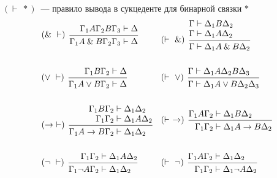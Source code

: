 \documentclass[main]{subfiles}
\begin{document}
$(\vdash \ *)$~--- правило вывода в сукцеденте для бинарной связки $*$
\begin{align*}
     & \begin{prooftree}
           \hypo{\Gamma_1 A\Gamma_2 B\Gamma_3 &\vdash \Delta}
           \infer[left label=$(\and \ \vdash)$]1{\Gamma_1 A \and B \Gamma_2 \Gamma_3 &\vdash \Delta}
       \end{prooftree} &
     & \begin{prooftree}
           \hypo{ \Gamma &\vdash \Delta_1 B\Delta_2}
           \infer[no rule]1{ \Gamma &\vdash \Delta_1A\Delta_2 }
           \infer[left label=$(\vdash \ \and)$]1{ \Gamma &\vdash \Delta_1 A \and B \Delta_2}
       \end{prooftree}
    \\
    \\
     & \begin{prooftree}
           \hypo{\Gamma_1 B\Gamma_2 &\vdash \Delta}
           \infer[left label=$(\lor \ \vdash)$]1{\Gamma_1 A\lor B\Gamma_2 &\vdash \Delta}
       \end{prooftree}            &
     & \begin{prooftree}
           \hypo{\Gamma &\vdash \Delta_1A\Delta_2B\Delta_3}
           \infer[left label=$(\vdash \ \lor)$]1{\Gamma &\vdash \Delta_1 A\lor B\Delta_2\Delta_3}
       \end{prooftree}
    \\
    \\
     & \begin{prooftree}
           \hypo{\Gamma_1B\Gamma_2 &\vdash\Delta_1\Delta_2}
           \infer[no rule]1{\Gamma_1\Gamma_2 &\vdash \Delta_1 A \Delta_2}
           \infer[left label=$(\to \ \vdash)$]1{\Gamma_1 A\to B\Gamma_2 &\vdash \Delta_1 \Delta_2}
       \end{prooftree}   &
     & \begin{prooftree}
           \hypo{\Gamma_1A\Gamma_2 &\vdash \Delta_1B\Delta_2}
           \infer[left label=$(\vdash \ \to)$]1{\Gamma_1\Gamma_2 &\vdash \Delta_1A\to B \Delta_2}
       \end{prooftree}
    \\
    \\
     & \begin{prooftree}
           \hypo{\Gamma_1 \Gamma_2 &\vdash \Delta_1A\Delta_2}
           \infer[left label=$(\lnot\ \vdash)$]1{\Gamma_1 \lnot A\Gamma_2 &\vdash \Delta_1\Delta_2}
       \end{prooftree}  &
     & \begin{prooftree}
           \hypo{\Gamma_1 A\Gamma_2 &\vdash \Delta_1\Delta_2}
           \infer[left label=$(\vdash \ \lnot)$]1{\Gamma_1 \Gamma_2 &\vdash \Delta_1\lnot A\Delta_2}
       \end{prooftree}
\end{align*}
\end{document}
